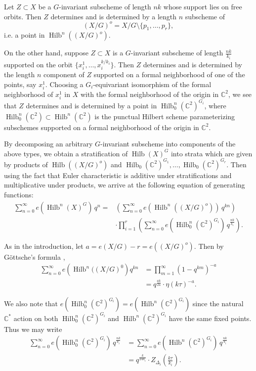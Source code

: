 \documentclass{article}
\theoremstyle{definition}
\newcommand{\CC} {{\mathbb C}}          %
\newcommand{\Hilb}{\operatorname{Hilb}}
\begin{document}
Let $Z\subset X$ be a $G$-invariant subscheme of length $nk$ whose
support lies on free orbits. Then $Z$ determines and is determined by
a length $n$ subscheme of 
\[
(X/G)^{o}  = X/G\setminus \{p_{1},\dotsc ,p_{r} \},
\]
i.e. a point
in $\Hilb^{n}((X/G)^{o})$.

On the other hand, suppose $Z\subset X$ is a $G$-invariant subscheme
of length $\frac{nk}{k_{i}}$ supported on the orbit
$\{x_{i}^{1},\dotsc ,x_{i}^{k/k_{i}} \}$. Then $Z$ determines and is
determined by the length $n$ component of $Z$ supported on a formal
neighborhood of one of the points, say $x_{i}^{1}$. Choosing a
$G_{i}$-equivariant isomorphism of the formal neighborhood of
$x_{i}^{1}$ in $X$ with the formal neighborhood of the origin in
$\CC^{2}$, we see that $Z$ determines and is determined by a point in
$\Hilb_{0}^{n}(\CC^{2})^{G_{i}}$, where $\Hilb_{0}^{n}(\CC^{2})\subset
\Hilb^{n}(\CC^{2})$ is the punctual Hilbert scheme parameterizing
subschemes supported on a formal neighborhood of the origin in
$\CC^{2}$.

By decomposing an arbitrary $G$-invariant subscheme into components of
the above types, we obtain a stratification of $\Hilb (X)^{G}$ into
strata which are given by products of $\Hilb ((X/G)^{o})$ and
$\Hilb_{0}(\CC^{2})^{G_{1}},\dotsc ,\Hilb_{0}(\CC^{2})^{G_{r}}$. Then
using the fact that Euler characteristic is additive under
stratifications and multiplicative under products, we arrive at the
following equation of generating functions:
\begin{align}\label{eqn: stratification formula for sum e(hilb(X)G)}
\nonumber\sum_{n=0}^{\infty} e\left(\Hilb^{n}(X)^{G} \right)\, q^{n}
=&\left(\sum_{n=0}^{\infty} e\left(\Hilb^{n}((X/G)^{o}) \right)\,
q^{kn} \right)\\
& \cdot \prod_{i=1}^{r}\left( \sum_{n=0}^{\infty}
e\left(\Hilb_{0}^{n}(\CC^{2})^{G_{i}} \right) \, q^{\frac{nk}{k_{i}}}
\right) .
\end{align}

As in the introduction, let $a = e(X/G)-r=e\left((X/G)^{o}
\right)$. Then by G\"ottsche's formula \cite{gottsche1990betti},
\begin{align*}
\sum_{n=0}^{\infty} e\left(\Hilb^{n}((X/G)^{0} \right) q^{kn} &=
\prod_{m=1}^{\infty} (1-q^{km})^{-a}\\
&= q^{\frac{ak}{24}} \cdot \eta (k\tau )^{-a}. 
\end{align*}

We also note that $e\left(\Hilb_{0}^{n}(\CC^{2})^{G_{i}}
\right)=e\left(\Hilb^{n}(\CC^{2})^{G_{i}} \right)$ since the natural
$\CC^{*}$ action on both $\Hilb_{0}^{n}(\CC^{2})^{G_{i}}$ and
$\Hilb^{n}(\CC^{2})^{G_{i}}$ have the same fixed points. Thus we may
write
\begin{align*}
\sum_{n=0}^{\infty} e\left(\Hilb_{0}^{n}(\CC^{2})^{G_{i}} \right) \,
q^{\frac{nk}{k_{i}}} &= \sum_{n=0}^{\infty} e\left(\Hilb^{n}(\CC^{2})^{G_{i}} \right) \,
q^{\frac{nk}{k_{i}}}\\
&= q^{\frac{k}{24k_{i}}} \cdot Z_{\Delta_{i}} \left(\frac{k\tau}{k_{i}}
\right) .
\end{align*}
\end{document}
